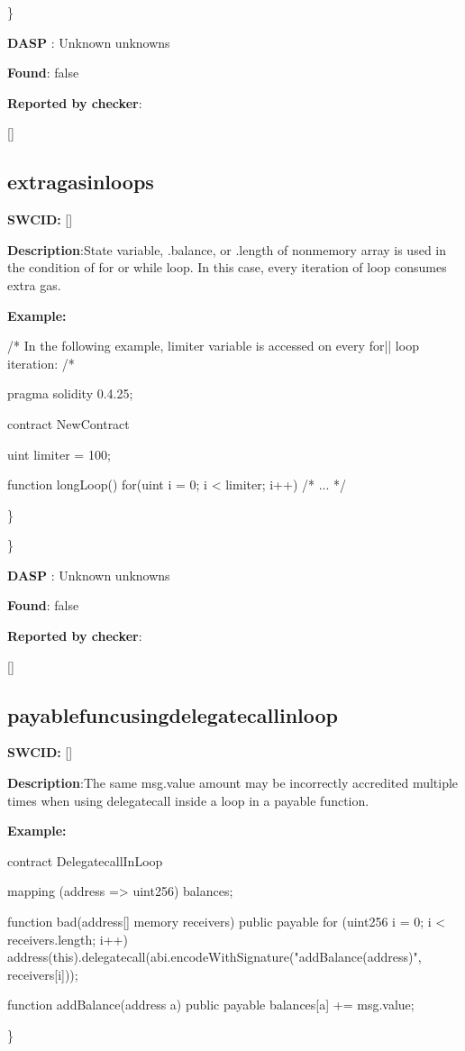 \documentclass{article}
\begin{document}
\} 

\textbf{DASP} : Unknown unknowns

\textbf{Found}: false

\textbf{Reported by checker}: 
\begin{ffcode} 

[]
\end{ffcode} 
\subsection{extra{\textunderscore}gas{\textunderscore}in{\textunderscore}loops} 
\textbf{SWC{\textunderscore}ID:} []

\textbf{Description}:State variable, .balance, or .length of non{\textendash}memory array is used in the condition of for or while loop. In this case, every iteration of loop consumes extra gas.


\textbf{Example:} 
\begin{ffcode} 

/* In the following example, limiter variable is accessed on every for|\textendash| loop iteration: /* 

pragma solidity 0.4.25;

contract NewContract {
    uint limiter = 100;

    function longLoop() {
        for(uint i = 0; i < limiter; i++) {
            /* ... */
        }
    }
}

\end{ffcode} 
\} 

\} 

\textbf{DASP} : Unknown unknowns

\textbf{Found}: false

\textbf{Reported by checker}: 
\begin{ffcode} 

[]
\end{ffcode} 
\subsection{payable{\textunderscore}func{\textunderscore}using{\textunderscore}delegatecall{\textunderscore}in{\textunderscore}loop} 
\textbf{SWC{\textunderscore}ID:} []

\textbf{Description}:The same msg.value amount may be incorrectly accredited multiple times when using delegatecall inside a loop in a payable function.


\textbf{Example:} 
\begin{ffcode} 

contract DelegatecallInLoop{

    mapping (address => uint256) balances;

    function bad(address[] memory receivers) public payable {
        for (uint256 i = 0; i < receivers.length; i++) {
            address(this).delegatecall(abi.encodeWithSignature("addBalance(address)", receivers[i]));
        }
    }

    function addBalance(address a) public payable {
        balances[a] += msg.value;
    }
}

\end{ffcode} 
\} 
\end{document}
